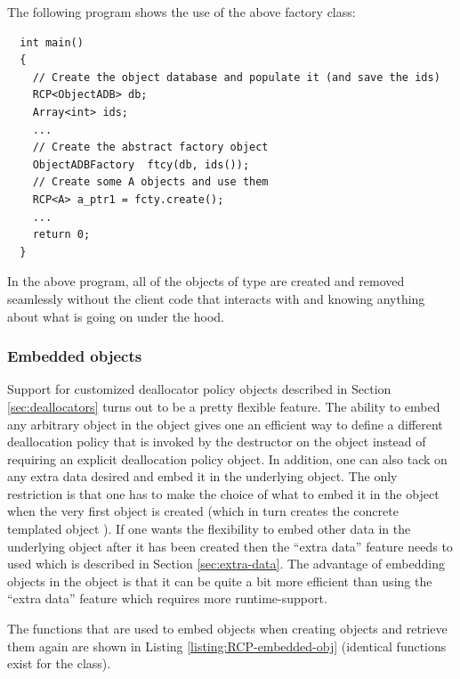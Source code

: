 \documentclass[pdf,ps2pdf,11pt]{SANDreport}
\begin{document}
The following program shows the use of the above factory class:

{\small\begin{verbatim}
  int main()
  {
    // Create the object database and populate it (and save the ids)
    RCP<ObjectADB> db;
    Array<int> ids;
    ...
    // Create the abstract factory object
    ObjectADBFactory  ftcy(db, ids());
    // Create some A objects and use them
    RCP<A> a_ptr1 = fcty.create();
    ...
    return 0;
  }
\end{verbatim}}

In the above program, all of the objects of type {} are
created and removed seamlessly without the client code that interacts
with {} and {} knowing anything
about what is going on under the hood.


%
{}\subsubsection{Embedded objects}
\label{sec:embedded-objecs}
%

Support for customized deallocator policy objects described in Section
{}\ref{sec:deallocators} turns out to be a pretty flexible feature.
The ability to embed any arbitrary object in the {}
object gives one an efficient way to define a different deallocation
policy that is invoked by the destructor on the object instead of
requiring an explicit deallocation policy object.  In addition, one
can also tack on any extra data desired and embed it in the underlying
{} object.  The only restriction is that one has to
make the choice of what to embed it in the {} object when
the very first {} object is created (which in turn creates
the concrete templated {} object ).  If one wants the
flexibility to embed other data in the underlying {}
object after it has been created then the ``extra data'' feature needs
to used which is described in Section {}\ref{sec:extra-data}.  The
advantage of embedding objects in the {} object is
that it can be quite a bit more efficient than using the ``extra
data'' feature which requires more runtime-support.

The functions that are used to embed objects when creating
{} objects and retrieve them again are shown in Listing
{}\ref{listing:RCP-embedded-obj} (identical functions exist for the
{} class).
\end{document}
